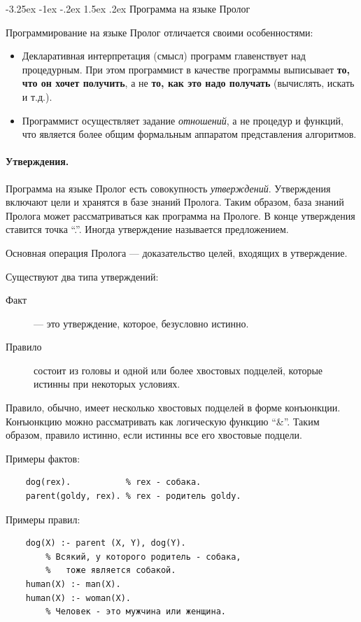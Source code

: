 \documentclass[12pt, openany, twoside]{book} %
\makeatletter
\renewcommand\section{\@startsection {section}{1}{\z@}%
                                   {-3.25ex \@plus -1ex \@minus -.2ex}%
                                   {1.5ex \@plus.2ex}%
                                   {\normalfont\large\bfseries}}
\makeatother
\begin{document}
\section{Программа на языке Пролог}

Программирование на языке Пролог отличается своими особенностями:
\begin{itemize}
\item Декларативная интерпретация (смысл) программ главенствует над процедурным. При этом  программист в качестве программы выписывает {\bf то, что он хочет получить}, а не  {\bf то, как это надо получать} (вычислять, искать и т.д.).
\item Программист осуществляет задание \emph{отношений}, а не {процедур и функций}, что является более общим формальным аппаратом представления алгоритмов.
\end{itemize}

\paragraph{Утверждения.} Программа на языке Пролог есть совокупность \emph{утверждений}. Утверждения включают цели и хранятся в базе знаний Пролога. Таким образом, база знаний Пролога может рассматриваться как программа на Прологе. В конце утверждения ставится точка ``.''. Иногда утверждение называется предложением.

Основная операция Пролога --- доказательство целей, входящих в утверждение.

Существуют два типа утверждений:
\begin{description}
\item[Факт] --- это утверждение, которое, безусловно истинно.
\item[Правило] состоит из головы и одной или более хвостовых подцелей, которые истинны при некоторых условиях.
\end{description}

Правило, обычно, имеет несколько хвостовых подцелей в форме конъюнкции. Конъюнкцию можно рассматривать как логическую функцию ``\&''. Таким образом, правило истинно, если истинны все его хвостовые подцели.

Примеры фактов:
{\tt\begin{verbatim}
    dog(rex).           % rex - собака.
    parent(goldy, rex). % rex - родитель goldy.
\end{verbatim}}

Примеры правил:
{\tt\begin{verbatim}
    dog(X) :- parent (X, Y), dog(Y).
        % Всякий, у которого родитель - собака,
        %   тоже является собакой.
    human(Х) :- man(Х).
    human(Х) :- woman(Х).
        % Человек - это мужчина или женщина.
\end{verbatim}}
\end{document}

